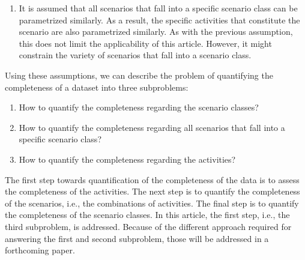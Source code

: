 \begin{enumerate}
	\item It is assumed that all scenarios that fall into a specific scenario class can be parametrized similarly. As a result, the specific activities that constitute the scenario are also parametrized similarly. As with the previous assumption, this does not limit the applicability of this article. However, it might constrain the variety of scenarios that fall into a scenario class. 
\end{enumerate}

Using these assumptions, we can describe the problem of quantifying the completeness of a dataset into three subproblems:
\begin{enumerate}
	\item How to quantify the completeness regarding the scenario classes?
	\item How to quantify the completeness regarding all scenarios that fall into a specific scenario class?
	\item How to quantify the completeness regarding the activities?
\end{enumerate}


The first step towards quantification of the completeness of the data is to assess the completeness of the activities. The next step is to quantify the completeness of the scenarios, i.e., the combinations of activities. The final step is to quantify the completeness of the scenario classes. In this article,  the first step, i.e., the third subproblem, is addressed. Because of the different approach required for answering the first and second subproblem, those will be addressed in a forthcoming paper. 
